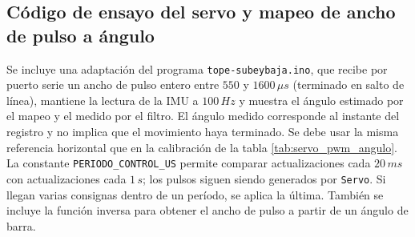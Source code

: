 \documentclass[a4paper, twoside, 10pt, spanish]{article}
\numberwithin{table}{section}
\begin{document}
\subsection{Código de ensayo del servo y mapeo de ancho de pulso a ángulo}
\label{sec:codigo_servo}
Se incluye una adaptación del programa \texttt{tope-subeybaja.ino}, que
recibe por puerto serie un ancho de pulso entero entre $550$ y
$1600\,\mu s$ (terminado en salto de línea), mantiene la lectura de la
IMU a $100\,Hz$ y muestra el ángulo estimado por el mapeo y el medido por
el filtro. El ángulo medido corresponde al instante del registro y no
implica que el movimiento haya terminado. Se debe usar la misma referencia
horizontal que en la calibración de la tabla \ref{tab:servo_pwm_angulo}.
La constante \texttt{PERIODO\_CONTROL\_US} permite comparar actualizaciones
cada $20\,ms$ con actualizaciones cada $1\,s$; los pulsos siguen siendo
generados por \texttt{Servo}. Si llegan varias consignas dentro de un
período, se aplica la última. También se incluye la función inversa para
obtener el ancho de pulso a partir de un ángulo de barra.

\end{document}
